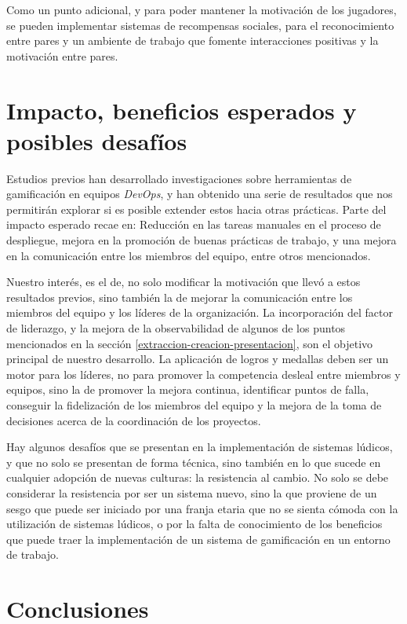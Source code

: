 \documentclass[journal]{IEEEtran}
\begin{document}
Como un punto adicional, y para poder mantener la motivación de los jugadores, se pueden implementar sistemas de recompensas sociales, para el reconocimiento entre pares y un ambiente de trabajo que fomente interacciones positivas y la motivación entre pares.

\section{\textbf{\Large Impacto, beneficios esperados y posibles desafíos}}

Estudios previos han desarrollado investigaciones sobre herramientas de gamificación en equipos \textit{DevOps}, y han obtenido una serie de resultados que nos permitirán explorar si es posible extender estos hacia otras prácticas. Parte del impacto esperado recae en\cite{ayoup2022achievement}: Reducción en las tareas manuales en el proceso de despliegue, mejora en la promoción de buenas prácticas de trabajo, y una mejora en la comunicación entre los miembros del equipo, entre otros mencionados.

Nuestro interés, es el de, no solo modificar la motivación que llevó a estos resultados previos, sino también la de mejorar la comunicación entre los miembros del equipo y los líderes de la organización. La incorporación del factor de liderazgo, y la mejora de la observabilidad de algunos de los puntos mencionados en la sección \ref{extraccion-creacion-presentacion}, son el objetivo principal de nuestro desarrollo. La aplicación de logros y medallas deben ser un motor para los líderes, no para promover la competencia desleal entre miembros y equipos, sino la de promover la mejora continua, identificar puntos de falla, conseguir la fidelización de los miembros del equipo y la mejora de la toma de decisiones acerca de la coordinación de los proyectos.

Hay algunos desafíos que se presentan en la implementación de sistemas lúdicos, y que no solo se presentan de forma técnica, sino también en lo que sucede en cualquier adopción de nuevas culturas: la resistencia al cambio. No solo se debe considerar la resistencia por ser un sistema nuevo, sino la que proviene de un sesgo que puede ser iniciado por una franja etaria que no se sienta cómoda con la utilización de sistemas lúdicos, o por la falta de conocimiento de los beneficios que puede traer la implementación de un sistema de gamificación en un entorno de trabajo\cite[Quinta Parte: Gamificación - Cuando la gamificación es inútil]{nallar2015estructuraludica}.

\section{\textbf{\Large Conclusiones}}




\end{document}
